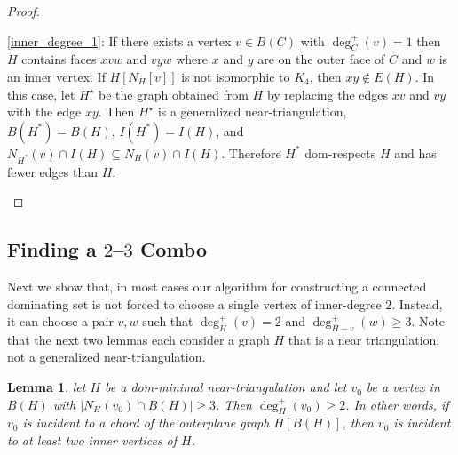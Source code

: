 \documentclass{article}
\newtheorem{lem}{Lemma}
\theoremstyle{definition}
\begin{document}
\begin{proof}
\begin{compactenum}
    \item \cref{inner_degree_1}: If there exists a vertex $v\in B(C)$ with $\deg^+_C(v)=1$ then $H$ contains faces $xvw$ and $vyw$ where $x$ and $y$ are on the outer face of $C$ and $w$ is an inner vertex. If $H[N_H[v]]$ is not isomorphic to $K_4$, then $xy\not\in E(H)$.  In this case, let $H^\star$ be the graph obtained from $H$ by replacing the edges $xv$ and $vy$ with the edge $xy$. Then $H^\star$ is a generalized near-triangulation, $B(H^*)=B(H)$, $I(H^*)=I(H)$, and $N_{H^*}(v)\cap I(H)\subseteq N_{H}(v)\cap I(H)$.  Therefore $H^*$ dom-respects $H$ and has fewer edges than $H$. \qedhere
  \end{compactenum}
\end{proof}

\subsection{Finding a $2$--$3$ Combo}
\label{combo}

Next we show that, in most cases our algorithm for constructing a connected dominating set is not forced to choose a single vertex of inner-degree $2$. Instead, it can choose a pair $v,w$ such that $\deg^+_H(v)=2$ and $\deg^+_{H-v}(w)\ge 3$. Note that the next two lemmas each consider a graph $H$ that is a near triangulation, not a generalized near-triangulation.

\begin{lem}\label{chord_incident}
  let $H$ be a dom-minimal near-triangulation and let $v_0$ be a vertex in $B(H)$ with $|N_H(v_0)\cap B(H)|\ge 3$.  Then $\deg^+_H(v_0)\ge 2$.  In other words, if $v_0$ is incident to a chord of the outerplane graph $H[B(H)]$, then $v_0$ is incident to at least two inner vertices of $H$.
\end{lem}
\end{document}
